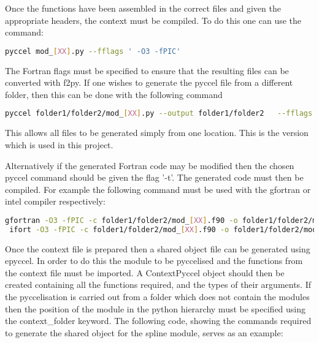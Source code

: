 Once the functions have been assembled in the correct files and given the appropriate headers, the context must be compiled. To do this one can use the command:

\begin{lstlisting}[language=bash,style=bashStyle]
 pyccel mod_[XX].py --fflags ' -O3 -fPIC'
\end{lstlisting}

The Fortran flags must be specified to ensure that the resulting files can be converted with f2py. If one wishes to generate the pyccel file from a different folder, then this can be done with the following command

\begin{lstlisting}[language=bash,style=bashStyle]
 pyccel folder1/folder2/mod_[XX].py --output folder1/folder2   --fflags ' -O3 -fPIC'
\end{lstlisting}

This allows all files to be generated simply from one location. This is the version which is used in this project.

Alternatively if the generated Fortran code may be modified then the chosen pyccel command should be given the flag '-t'. The generated code must then be compiled. For example the following command must be used with the gfortran or intel compiler respectively:

\begin{lstlisting}[language=bash,style=bashStyle]
 gfortran -O3 -fPIC -c folder1/folder2/mod_[XX].f90 -o folder1/folder2/mod_[XX].o  -J folder1/folder2/
 ifort -O3 -fPIC -c folder1/folder2/mod_[XX].f90 -o folder1/folder2/mod_[XX].o  -module folder1/folder2/
\end{lstlisting}

Once the context file is prepared then a shared object file can be generated using epyccel. In order to do this the module to be pyccelised and the functions from the context file must be imported. A ContextPyccel object should then be created containing all the functions required, and the types of their arguments. If the pyccelisation is carried out from a folder which does not contain the modules then the position of the module in the python hierarchy must be specified using the context\_folder keyword. The following code, showing the commands required to generate the shared object for the spline module, serves as an example:

